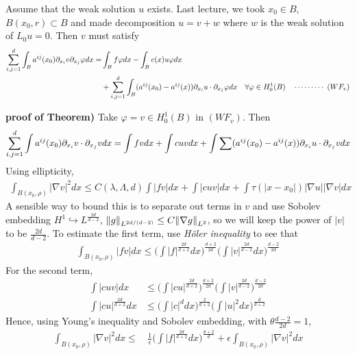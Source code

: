 \documentclass[12pt,a4paper]{article}
\newenvironment{proof}
{\begin{changemargin}{0.5cm}{0.5cm} 
	}%
	{\end{changemargin}
}
\newenvironment{p}
{\begin{proof} 
	}%
	{\end{proof}
}
\begin{document}
Assume that the weak solution $u$ exists. Last lecture, we took $x_0 \in B$, $B(x_0, r) \subset B$ and made decomposition $u= v+ w$ where $w$ is the weak solution of $L_0 u =0$. Then $v$ must satisfy
\begin{align*}
\sum_{i,j=1}^d \int_B a^{ij}(x_0)\partial_{x_i} v \partial_{x_j} \varphi dx = & \int_B f\varphi dx -\int_B c(x)u\varphi dx \\
&+ \sum_{i,j=1}^d \int_B (a^{ij}(x_0)- a^{ij}(x)) \partial_{x_i} u \cdot \partial_{x_j} \varphi dx \quad \forall \varphi \in H^1_0(B) \quad \cdots\cdots\cdots\,\,(WF_v)
\end{align*}
\begin{p}
\textbf{proof of Theorem)} Take $\varphi =v \in H_0^1(B)$ in $(WF_v)$. Then
\begin{align*}
\sum_{i,j=1}^d \int a^{ij}(x_0) \partial_{x_i} v \cdot \partial_{x_j} v dx = \int fv dx + \int cuv dx + \int \sum(a^{ij}(x_0)- a^{ij}(x)) \partial_{x_i} u \cdot \partial_{x_j} v dx
\end{align*}
Using ellipticity,
\begin{align*}
\int_{B(x_0, \rho)} |\nabla v|^2 dx \leq C(\lambda, \Lambda, d) \int |fv| dx + \int |cuv| dx +  \int \tau(|x-x_0|) |\nabla u||\nabla v| dx
\end{align*}
A sensible way to bound this is to separate out terms in $v$ and use Sobolev embedding $H^1 \hookrightarrow L^{\frac{2d}{d-2}}$, $\snorms{g}{L^{2d/(d-2)}} \leq C \snorms{\nabla g}{L^2}$, so we will keep the power of $|v|$ to be $\frac{2d}{d-2}$. To estimate the first term, use \emph{H\"oler inequality} to see that
\begin{align*}
\int_{B(x_0, \rho)} |fv| dx \leq  \Big( \int |f|^{\frac{2d}{d+2}} dx\Big)^{\frac{d+2}{2d}} \Big( \int |v|^{\frac{2d}{d-2}} dx \Big)^{\frac{d-2}{2d}}
\end{align*}
For the second term,
\begin{align*}
\int |cuv| dx & \leq \Big( \int |cu|^{\frac{2d}{d+2}} \Big)^{\frac{d+2}{2d}} \Big( \int |v|^{\frac{2d}{d-2}} \Big)^{\frac{d-2}{2d}} \\
\int |cu|^{\frac{2d}{d+2}} dx & \leq \Big( \int |c|^{d} dx\Big)^{\frac{2}{d+2}} \Big(\int |u|^{2} dx \Big)^{\frac{d}{d+2}}
\end{align*}
Hence, using Young's inequality and Sobolev embedding, with $\theta \frac{d-2}{2d} =1$, 
\begin{align*}
\int_{B(x_0, \rho)} |\nabla v|^2 dx \leq & \, \frac{1}{\epsilon} \Big( \int |f|^{\frac{2d}{d+2}} dx \Big)^{\frac{d+2}{d}} + \epsilon \int_{B(x_0, \rho) } |\nabla v|^2 dx \\

\end{align*}
\end{p}
\end{document}
